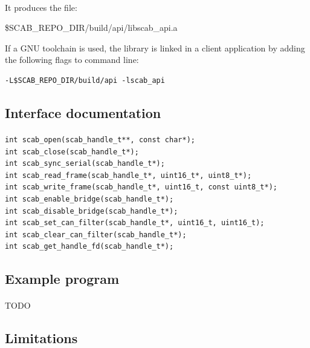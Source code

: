 \documentclass[a4paper, 11pt]{article}
\begin{document}
\paragraph{}
It produces the file:
\begin{center}
\$SCAB\_REPO\_DIR/build/api/libscab\_api.a
\end{center}

If a GNU toolchain is used, the library is linked in a client application
by adding the following flags to command line:\\
\begin{small}
\lstset{language=C}
\begin{lstlisting}[frame=tb]
-L$SCAB_REPO_DIR/build/api -lscab_api
\end{lstlisting}
\end{small}

\subsection{Interface documentation}
\paragraph{}
\begin{small}
\lstset{language=C}
\begin{lstlisting}[frame=tb]
int scab_open(scab_handle_t**, const char*);
int scab_close(scab_handle_t*);
int scab_sync_serial(scab_handle_t*);
int scab_read_frame(scab_handle_t*, uint16_t*, uint8_t*);
int scab_write_frame(scab_handle_t*, uint16_t, const uint8_t*);
int scab_enable_bridge(scab_handle_t*);
int scab_disable_bridge(scab_handle_t*);
int scab_set_can_filter(scab_handle_t*, uint16_t, uint16_t);
int scab_clear_can_filter(scab_handle_t*);
int scab_get_handle_fd(scab_handle_t*);
\end{lstlisting}
\end{small}

\subsection{Example program}
\paragraph{}
TODO

\subsection{Limitations}
\end{document}
